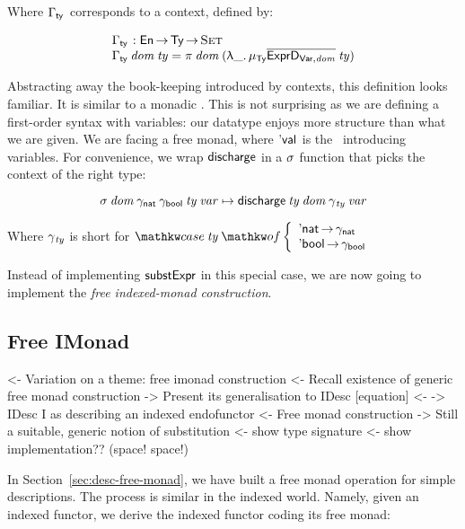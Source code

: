 Where $\GammaSpi{\!}{\!}$ corresponds to a context, defined by:

\[\stk{
\GammaSpi{\!}{\!} : \EnumU \To \Ty \To \Set                                             \\
\GammaSpi{\V{dom}}{\V{ty}} = \spi{\V{dom}}{(\LAM{\_} \IMu{\Ty}{\toIDesc{\HExprVarD{\V{dom}}}}{\V{ty}})} 
}\]


Abstracting away the book-keeping introduced by contexts, this
definition looks familiar. It is similar to a monadic \bind. This is
not surprising as we are defining a first-order syntax with variables:
our datatype enjoys more structure than what we are given. We are
facing a free monad, where $\Eval{\!}$ is the \return\ introducing
variables. For convenience, we wrap $\discharge$ in a $\V{\sigma}$
function that picks the context of the right type:

\[
\F{$\sigma$}\: \V{dom}\: \gammaNat\: \gammaBool\: \V{ty}\: \V{var} \mapsto
    \F{$\discharge$}\: \V{ty}\: \V{dom}\: \F{$\gamma$}_{\V{ty}}\: \V{var} 
\]

Where $\F{$\gamma$}_{\V{ty}}$ is short for
 $\caseB{\V{ty}}{\Enat  \To \gammaNat \\
                 \Ebool \To \gammaBool}$

Instead of implementing $\substH$ in this special case, we are now
going to implement the \emph{free indexed-monad construction}.

\subsection{Free IMonad}

\begin{wstructure}
<- Variation on a theme: free imonad construction
    <- Recall existence of generic free monad construction
    -> Present its generalisation to IDesc [equation]
        <- \I -> IDesc I as describing an indexed endofunctor
        <- Free monad construction
    -> Still a suitable, generic notion of substitution
        <- show type signature
        <- show implementation?? (space! space!)
\end{wstructure}

In Section~\ref{sec:desc-free-monad}, we have built a free monad
operation for simple descriptions. The process is similar in the
indexed world. Namely, given an indexed functor, we derive the indexed
functor coding its free monad: 

